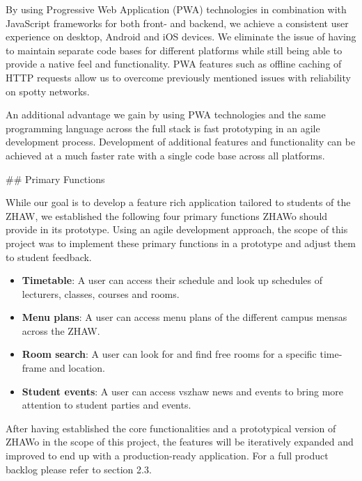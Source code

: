 \begin{markdown}
By using Progressive Web Application (PWA) technologies \cite{PWA} in combination with JavaScript frameworks for both front- and backend, we achieve a consistent user experience on desktop, Android and iOS devices. We eliminate the issue of having to maintain separate code bases for different platforms while still being able to provide a native feel and functionality. PWA features such as offline caching of HTTP requests allow us to overcome previously mentioned issues with reliability on spotty networks.

An additional advantage we gain by using PWA technologies and the same programming language across the full stack is fast prototyping in an agile development process. Development of additional features and functionality can be achieved at a much faster rate with a single code base across all platforms.

\newpage

## Primary Functions

While our goal is to develop a feature rich application tailored to students of the ZHAW, we established the following four primary functions ZHAWo should provide in its prototype. Using an agile development approach, the scope of this project was to implement these primary functions in a prototype and adjust them to student feedback.

\begin{itemize}
  \item \textbf{Timetable}: A user can access their schedule and look up schedules of lecturers, classes, courses and rooms.
  \item \textbf{Menu plans}: A user can access menu plans of the different campus mensas across the ZHAW.
  \item \textbf{Room search}: A user can look for and find free rooms for a specific time-frame and location.
  \item \textbf{Student events}: A user can access vszhaw news and events to bring more attention to student parties and events.
\end{itemize}

After having established the core functionalities and a prototypical version of ZHAWo in the scope of this project, the features will be iteratively expanded and improved to end up with a production-ready application. For a full product backlog please refer to section 2.3.

\end{markdown}
